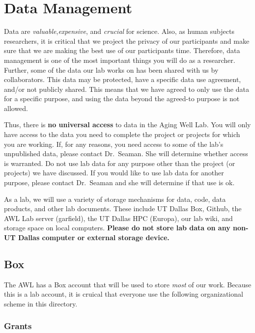 \documentclass[]{book}
\begin{document}
\hypertarget{data-management}{%
\chapter{Data Management}\label{data-management}}

Data are \emph{valuable},\emph{expensive}, and \emph{crucial} for science. Also, as human subjects researchers, it is critical that we project the privacy of our participants and make sure that we are making the best use of our participants time. Therefore, data management is one of the most important things you will do as a researcher. Further, some of the data our lab works on has been shared with us by collaborators. This data may be protected, have a specific data use agreement, and/or not publicly shared. This means that we have agreed to only use the data for a specific purpose, and using the data beyond the agreed-to purpose is not allowed.

Thus, there is \textbf{no universal access} to data in the Aging Well Lab. You will only have access to the data you need to complete the project or projects for which you are working. If, for any reasons, you need access to some of the lab's unpublished data, please contact Dr.~Seaman. She will determine whether access is warranted. Do not use lab data for any purpose other than the project (or projects) we have discussed. If you would like to use lab data for another purpose, please contact Dr.~Seaman and she will determine if that use is ok.

As a lab, we will use a variety of storage mechanisms for data, code, data products, and other lab documents. These include UT Dallas Box, Github, the AWL Lab server (garfield), the UT Dallas HPC (Europa), our lab wiki, and storage space on local computers. \textbf{Please do not store lab data on any non-UT Dallas computer or external storage device.}

\hypertarget{box}{%
\section{Box}\label{box}}

The AWL has a Box account that will be used to store \emph{most} of our work. Because this is a lab account, it is cruical that everyone use the following organizational scheme in this directory.

\hypertarget{grants}{%
\subsection{Grants}\label{grants}}
\end{document}
